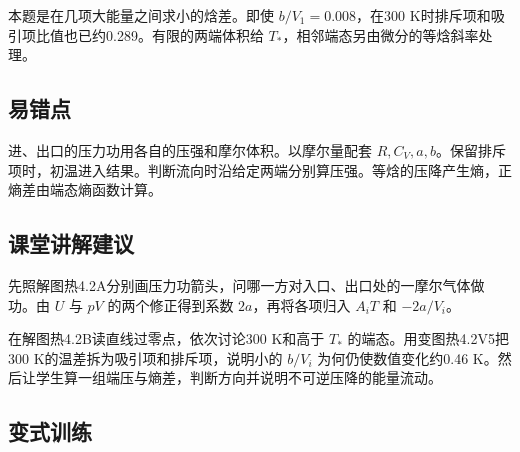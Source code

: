 \documentclass[UTF8,fontset=fandol,a4paper,11pt]{ctexart}
\begin{document}
本题是在几项大能量之间求小的焓差。即使 $b/V_1=0.008$，在300 K时排斥项和吸引项比值也已约0.289。有限的两端体积给 $T_*$，相邻端态另由微分的等焓斜率处理。



\subsection*{易错点}

进、出口的压力功用各自的压强和摩尔体积。以摩尔量配套 $R,C_V,a,b$。保留排斥项时，初温进入结果。判断流向时沿给定两端分别算压强。等焓的压降产生熵，正熵差由端态熵函数计算。



\subsection*{课堂讲解建议}

先照解图热4.2A分别画压力功箭头，问哪一方对入口、出口处的一摩尔气体做功。由 $U$ 与 $pV$ 的两个修正得到系数 $2a$，再将各项归入 $A_iT$ 和 $-2a/V_i$。

在解图热4.2B读直线过零点，依次讨论300 K和高于 $T_*$ 的端态。用变图热4.2V5把300 K的温差拆为吸引项和排斥项，说明小的 $b/V_i$ 为何仍使数值变化约0.46 K。然后让学生算一组端压与熵差，判断方向并说明不可逆压降的能量流动。



\subsection*{变式训练}
\end{document}
